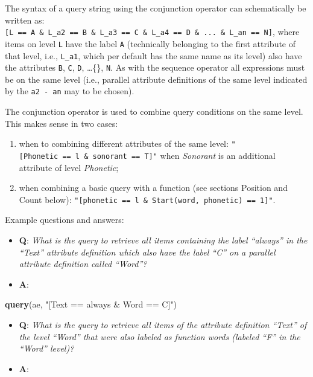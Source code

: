 \documentclass[]{book}
\newenvironment{Shaded}{\begin{snugshade}}{\end{snugshade}}
\newcommand{\KeywordTok}[1]{\textcolor[rgb]{0.13,0.29,0.53}{\textbf{#1}}}
\newcommand{\NormalTok}[1]{#1}
\newcommand{\StringTok}[1]{\textcolor[rgb]{0.31,0.60,0.02}{#1}}
\providecommand{\tightlist}{%
  \setlength{\itemsep}{0pt}\setlength{\parskip}{0pt}}
\begin{document}
The syntax of a query string using the conjunction operator can schematically be written as: \texttt{{[}L\ ==\ A\ \&\ L\_a2\ ==\ B\ \&\ L\_a3\ ==\ C\ \&\ L\_a4\ ==\ D\ \&\ ...\ \&\ L\_an\ ==\ N{]}}, where items on level \texttt{L} have the label \texttt{A} (technically belonging to the first attribute of that level, i.e., \texttt{L\_a1}, which per default has the same name as its level) also have the attributes \texttt{B}, \texttt{C}, \texttt{D}, \ldots\{\}, \texttt{N}. As with the sequence operator all expressions must be on the same level (i.e., parallel attribute definitions of the same level indicated by the \texttt{a2\ -\ an} may to be chosen).

The conjunction operator is used to combine query conditions on the same level. This makes sense in two cases:

\begin{enumerate}
\def\labelenumi{\arabic{enumi}.}
\tightlist
\item
  when to combining different attributes of the same level: \texttt{"{[}Phonetic\ ==\ l\ \&\ sonorant\ ==\ T{]}"} when \emph{Sonorant} is an additional attribute of level \emph{Phonetic};
\item
  when combining a basic query with a function (see sections Position and Count below): \texttt{"{[}phonetic\ ==\ l\ \&\ Start(word,\ phonetic)\ ==\ 1{]}"}.
\end{enumerate}

Example questions and answers:

\begin{itemize}
\tightlist
\item
  \textbf{Q}: \emph{What is the query to retrieve all items containing the label ``always'' in the ``Text'' attribute definition which also have the label ``C'' on a parallel attribute definition called ``Word''?}
\item
  \textbf{A}:
\end{itemize}

\begin{Shaded}
\begin{Highlighting}[]
\KeywordTok{query}\NormalTok{(ae, }\StringTok{"[Text == always & Word == C]"}\NormalTok{)}
\end{Highlighting}
\end{Shaded}

\begin{itemize}
\tightlist
\item
  \textbf{Q}: \emph{What is the query to retrieve all items of the attribute definition ``Text'' of the level ``Word'' that were also labeled as function words (labeled ``F'' in the ``Word'' level)?}
\item
  \textbf{A}:
\end{itemize}
\end{document}
